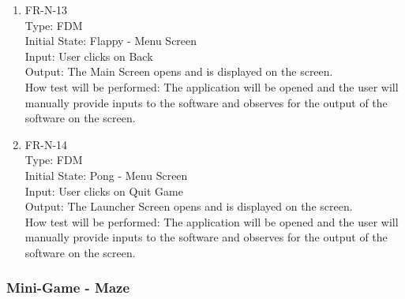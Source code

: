 \documentclass[12pt, titlepage]{article}
\begin{document}
\begin{enumerate}
\item{FR-N-13\\}
Type: FDM\\
Initial State: Flappy - Menu Screen\\
Input: User clicks on Back\\
Output: The Main Screen opens and is displayed on the screen.\\
How test will be performed: The application will be opened and the user will manually provide inputs to the software and observes for the output of the software on the screen.\\

\item{FR-N-14\\}
Type: FDM\\
Initial State: Pong - Menu Screen\\
Input: User clicks on Quit Game\\
Output: The Launcher Screen opens and is displayed on the screen.\\
How test will be performed: The application will be opened and the user will manually provide inputs to the software and observes for the output of the software on the screen.\\

\end{enumerate}

\subsubsection{Mini-Game - Maze}
\end{document}
